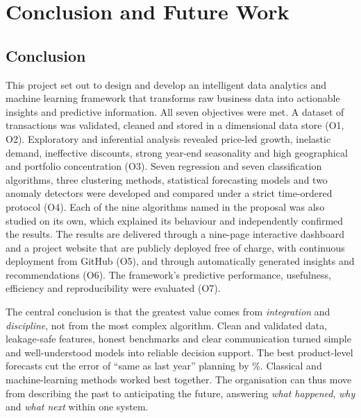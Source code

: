 \chapter{Conclusion and Future Work}\label{ch:conclusion}

\section{Conclusion}
This project set out to design and develop an intelligent data analytics and machine learning framework that
transforms raw business data into actionable insights and predictive information. All seven objectives were
met. A dataset of \NRows transactions was validated, cleaned and stored in a dimensional data store (O1, O2).
Exploratory and inferential analysis revealed price-led growth, inelastic demand, ineffective discounts, strong
year-end seasonality and high geographical and portfolio concentration (O3). Seven regression and seven
classification algorithms, three clustering methods, statistical forecasting models and two anomaly detectors
were developed and compared under a strict time-ordered protocol (O4). Each of the nine algorithms named in the
proposal was also studied on its own, which explained its behaviour and independently confirmed the results.
The results are delivered through a nine-page interactive dashboard and a project website that are publicly
deployed free of charge, with continuous deployment from GitHub (O5), and through automatically generated
insights and recommendations (O6). The framework's predictive performance, usefulness, efficiency and reproducibility were
evaluated (O7).

The central conclusion is that the greatest value comes from \emph{integration} and \emph{discipline}, not from
the most complex algorithm. Clean and validated data, leakage-safe features, honest benchmarks and clear
communication turned simple and well-understood models into reliable decision support. The best
product-level forecasts cut the error of ``same as last year'' planning by \GainVsSNaive\%. Classical and
machine-learning methods worked best together. The organisation can thus move from describing the past to
anticipating the future, answering \emph{what happened}, \emph{why} and \emph{what next} within one system.

